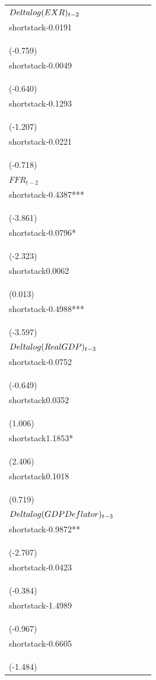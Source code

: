 \begin{table}[H]
\begin{tabular}{l c c c c}
$\\Delta\\log(EXR)_{t-2}$ & \\shortstack{-0.0191\\\\(-0.759)} & \\shortstack{-0.0049\\\\(-0.640)} & \\shortstack{-0.1293\\\\(-1.207)} & \\shortstack{-0.0221\\\\(-0.718)} \\
$FFR_{t-2}$ & \\shortstack{-0.4387***\\\\(-3.861)} & \\shortstack{-0.0796*\\\\(-2.323)} & \\shortstack{0.0062\\\\(0.013)} & \\shortstack{-0.4988***\\\\(-3.597)} \\
$\\Delta\\log(Real\\ GDP)_{t-3}$ & \\shortstack{-0.0752\\\\(-0.649)} & \\shortstack{0.0352\\\\(1.006)} & \\shortstack{1.1853*\\\\(2.406)} & \\shortstack{0.1018\\\\(0.719)} \\
$\\Delta\\log(GDP\\ Deflator)_{t-3}$ & \\shortstack{-0.9872**\\\\(-2.707)} & \\shortstack{-0.0423\\\\(-0.384)} & \\shortstack{-1.4989\\\\(-0.967)} & \\shortstack{-0.6605\\\\(-1.484)} \\

\end{tabular}
\end{table}
